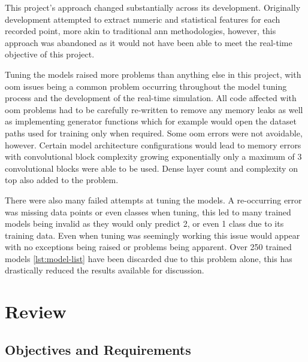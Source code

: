 \documentclass[12pt]{article}
\begin{document}
This project's approach changed substantially across its development. Originally development attempted to extract numeric and statistical features for each recorded point, more akin to traditional \acrshort{ann} methodologies, however, this approach was abandoned as it would not have been able to meet the real-time objective of this project.

Tuning the models raised more problems than anything else in this project, with \acrshort{oom} issues being a common problem occurring throughout the model tuning process and the development of the real-time simulation. All code affected with \acrshort{oom} problems had to be carefully re-written to remove any memory leaks as well as implementing generator functions which for example would open the dataset paths used for training only when required. Some \acrshort{oom} errors were not avoidable, however. Certain model architecture configurations would lead to memory errors with convolutional block complexity growing exponentially only a maximum of 3 convolutional blocks were able to be used. Dense layer count and complexity on top also added to the problem.

There were also many failed attempts at tuning the models. A re-occurring error was missing data points or even classes when tuning, this led to many trained models being invalid as they would only predict 2, or even 1 class due to its training data. Even when tuning was seemingly working this issue would appear with no exceptions being raised or problems being apparent. Over 250 trained models \ref{lst:model-list} have been discarded due to this problem alone, this has drastically reduced the results available for discussion.

\section{Review}

\subsection{Objectives and Requirements}
\end{document}
